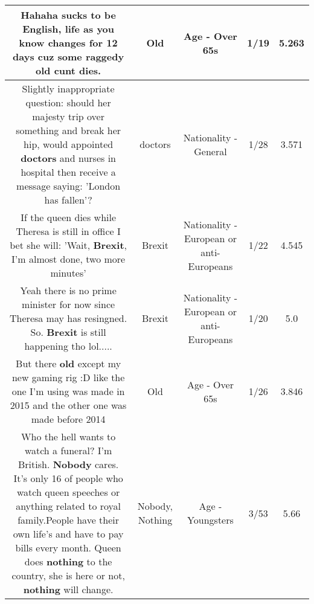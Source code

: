 \documentclass[11pt]{article}
\newlength\mylength
\begin{document}
\begin{center}
\begin{longtable}{|C{.65\mylength}|C{.30\mylength}|C{.12\mylength}|C{.12\mylength}|C{.12\mylength}|}
  \small Hahaha sucks to be English, life as you know changes for 12 days cuz some raggedy \textbf{old} cunt dies.\normalsize   & Old & Age - Over 65s & 1/19 & 5.263 \\  \hline
  \small Slightly inappropriate question: should her majesty trip over something and break her hip, would appointed \textbf{doctors} and nurses in hospital then receive a message saying: 'London has fallen'?\normalsize   & doctors & Nationality - General & 1/28 & 3.571 \\  \hline
  \small If the queen dies while Theresa is still in office I bet she will: 'Wait, \textbf{Brexit}, I'm almost done, two more minutes'\normalsize   & Brexit & Nationality - European or anti-Europeans & 1/22 & 4.545 \\  \hline
  \small Yeah there is no prime minister for now since Theresa may has resingned. So. \textbf{Brexit} is still happening tho lol.....\normalsize   & Brexit & Nationality - European or anti-Europeans & 1/20 & 5.0 \\  \hline
  \small But there \textbf{old} except my new gaming rig :D like the one I'm using was made in 2015 and the other one was made before 2014\normalsize   & Old & Age - Over 65s & 1/26 & 3.846 \\  \hline
  \small Who the hell wants to watch a funeral? I'm British. \textbf{Nobody} cares. It's only 16 of people who watch queen speeches or anything related to royal family.People have their own life's and have to pay bills every month. Queen does \textbf{nothing} to the country, she is here or not, \textbf{nothing} will change.\normalsize   & Nobody, Nothing & Age - Youngsters & 3/53 & 5.66 \\  \hline

\end{longtable}
\end{center}
\end{document}
